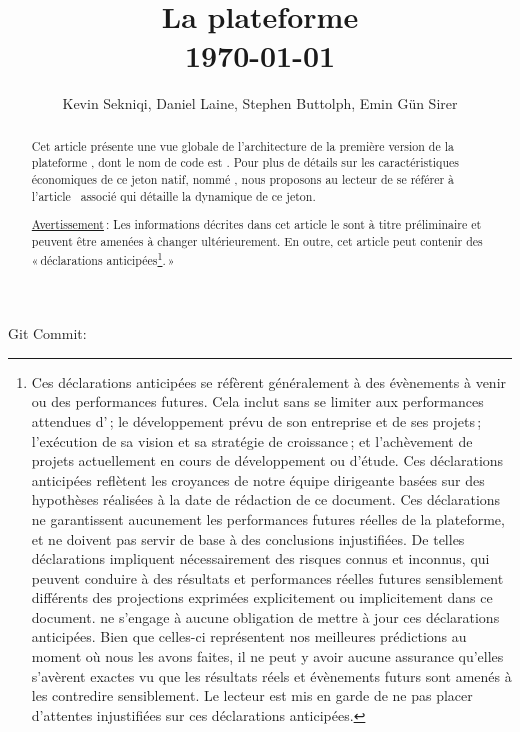 \documentclass[runningheads,francais,a4paper]{llncs}
\begin{document}
\immediate{}

\title{La plateforme \AVAPlatformName{}\\\today}
\author{Kevin Sekniqi, Daniel Laine, Stephen Buttolph, Emin G{\"u}n Sirer}
\institute{}

\maketitle

\begin{abstract}
Cet article présente une vue globale de l'architecture de la première version de la plateforme \AVAPlatformName{}, dont
le nom de code est \AVAPlatformNameFirstRelease{}. Pour plus de détails sur les caractéristiques économiques de ce
jeton natif, nommé \AVATokenName{}, nous proposons au lecteur de se référer à l'article~\cite{avatokenpaper} associé qui
détaille la dynamique de ce jeton.

\underline{Avertissement}\,: Les informations décrites dans cet article le sont à titre préliminaire et peuvent être
amenées à changer ultérieurement. En outre, cet article peut contenir des «\,déclarations
anticipées\footnote{Ces déclarations anticipées se réfèrent généralement à des évènements à venir ou des performances futures.
  Cela inclut sans se limiter aux performances attendues d'\AVAPlatformName{}\,; le développement prévu de son entreprise et
de ses projets\,; l'exécution de sa vision et sa stratégie de croissance\,; et l'achèvement de projets actuellement en
cours de développement ou d'étude. Ces déclarations anticipées reflètent les croyances de notre équipe dirigeante
basées sur des hypothèses réalisées à la date de rédaction de ce document. Ces déclarations ne garantissent aucunement
les performances futures réelles de la plateforme, et ne doivent pas servir de base à des conclusions injustifiées. De
telles déclarations impliquent nécessairement des risques connus et inconnus, qui peuvent conduire à des résultats et
performances réelles futures sensiblement différents des projections exprimées explicitement ou implicitement dans ce
document. \AVAPlatformName{} ne s'engage à aucune obligation de mettre à jour ces déclarations anticipées. Bien que celles-ci
représentent nos meilleures prédictions au moment où nous les avons faites, il ne peut y avoir aucune assurance qu'elles
s'avèrent exactes vu que les résultats réels et évènements futurs sont amenés à les contredire sensiblement. Le lecteur
est mis en garde de ne pas placer d'attentes injustifiées sur ces déclarations anticipées.}.\,»

\end{abstract}
\begin{center}
    \scriptsize Git Commit: 
 \end{center}
\end{document}

